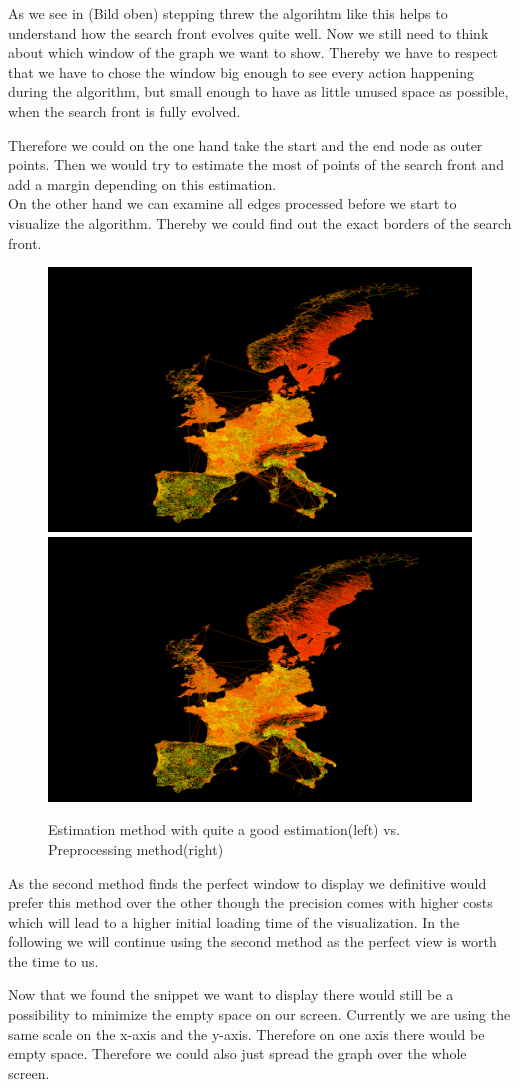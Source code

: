 \documentclass
[
	paper = a4,
    pagesize,
	12 pt,
	oneside,                       %
    open = right,
	DIV = calc,
	BCOR = 0 mm,                   %
	bibtotoc
]
{scrbook}
\begin{document}
As we see in (Bild oben) stepping threw the algorihtm like this helps to understand how the  search front evolves quite well.
Now we still need to think about which window of the graph we want to show.
Thereby we have to respect that we have to chose the window big enough to see every action happening during the algorithm, but small enough to have as little unused space as possible, when the search front is fully evolved.
\par
Therefore we could on the one hand take the start and the end node as outer points. Then we would try to estimate the most of points of the search front and add a margin depending on this estimation.
\\
On the other hand we can examine all edges processed before we start to visualize the algorithm. Thereby we could find out the exact borders of the search front.

\begin{figure}[h!]
	\includegraphics[width=.5\textwidth]{Images/placeholder.png}
	\includegraphics[width=.5\textwidth]{Images/placeholder.png}
\caption[]{Estimation method with quite a good estimation(left) vs. Preprocessing method(right)}
\label{fig:projections}
\end{figure}

As the second method finds the perfect window to display we definitive would prefer this method over the other though the precision comes with higher costs which will lead to a higher initial loading time of the visualization.
In the following we will continue using the second method as the perfect view is worth the time to us.
\par
Now that we found the snippet we want to display there would still be a possibility to minimize the empty space on our screen.
Currently we are using the same scale on the x-axis and the y-axis. Therefore on one axis there would be empty space.
Therefore we could also just spread the graph over the whole screen.
\end{document}

